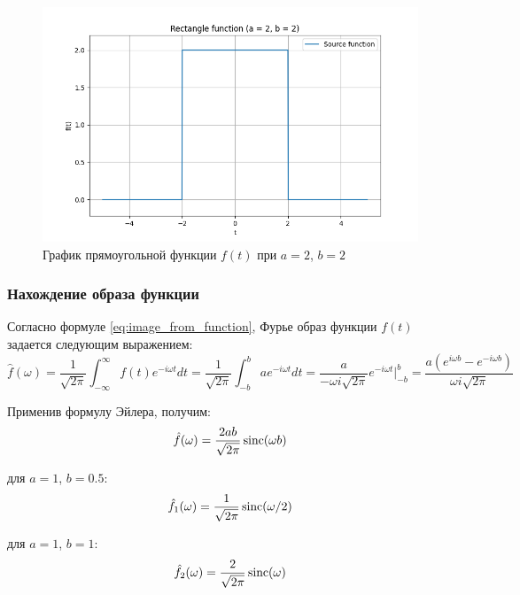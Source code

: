 \begin{figure}[ht!]
    \centering
    \includegraphics[width=\textwidth]{media/rectangle_3.png}
    \caption{График прямоугольной функции $f(t)$ при $a = 2$, $b = 2$}
    \label{fig:rectangle_3}
\end{figure}

\subsubsection{Нахождение образа функции}
Согласно формуле \eqref{eq:image_from_function}, Фурье образ функции $f(t)$ задается следующим выражением:
\begin{equation}
    \hat{f}(\omega) = \frac{1}{\sqrt{2\pi}} \int_{-\infty}^{\infty} f(t) e^{-i\omega t} dt = \frac{1}{\sqrt{2\pi}} \int_{-b}^{b} a e^{-i\omega t} dt = \frac{a}{-\omega i\sqrt{2\pi}} e^{-i\omega t} \Biggr|_{-b}^{b} = \frac{a(e^{i\omega b} - e^{-i\omega b})}{\omega i \sqrt{2 \pi}}
\end{equation}

Применив формулу Эйлера, получим:
\begin{equation}
    \hat{f}(\omega) = \frac{2ab}{\sqrt{2\pi}}\operatorname{sinc}(\omega b)
    \label{eq:rectangle_image}
\end{equation}

для $a = 1$, $b = 0.5$:
\begin{equation}
    \hat{f_1}(\omega) = \frac{1}{\sqrt{2\pi}}\operatorname{sinc}(\omega / 2)
\end{equation}

для $a = 1$, $b = 1$:
\begin{equation}
    \hat{f_2}(\omega) = \frac{2}{\sqrt{2\pi}}\operatorname{sinc}(\omega)
\end{equation}

